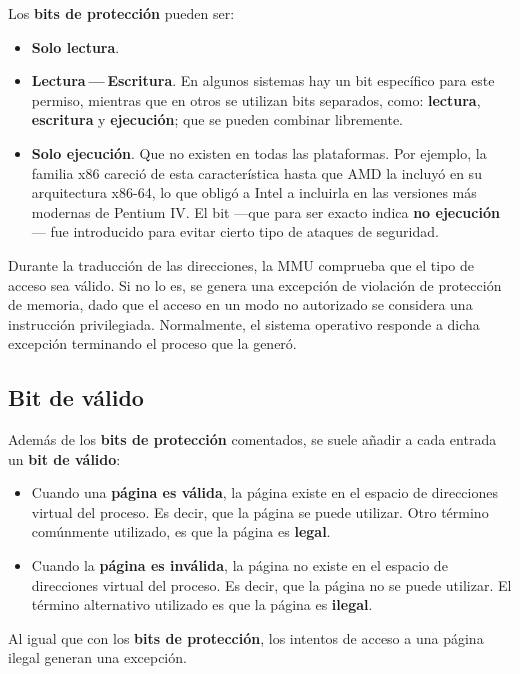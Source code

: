 {} Los \textbf{bits de protección} pueden ser:

\begin{itemize}
\item
  \textbf{Solo lectura}.
\item
  \textbf{Lectura --- Escritura}. En algunos sistemas hay un bit
  específico para este permiso, mientras que en otros se utilizan bits
  separados, como: \textbf{lectura}, \textbf{escritura} y
  \textbf{ejecución}; que se pueden combinar libremente.
\item
  \textbf{Solo ejecución}. Que no existen en todas las plataformas. Por
  ejemplo, la familia x86 careció de esta característica hasta que AMD
  la incluyó en su arquitectura x86-64, lo que obligó a Intel a
  incluirla en las versiones más modernas de Pentium IV. El bit ---que
  para ser exacto indica \textbf{no ejecución}--- fue introducido para
  evitar cierto tipo de ataques de seguridad.
\end{itemize}

Durante la traducción de las direcciones, la MMU comprueba que el tipo
de acceso sea válido. Si no lo es, se genera una excepción de violación
de protección de memoria, dado que el acceso en un modo no autorizado se
considera una instrucción privilegiada. Normalmente, el sistema
operativo responde a dicha excepción terminando el proceso que la
generó.

\subsection{Bit de válido}\label{_bit_de_vuxe1lido}

{} Además de los \textbf{bits de protección} comentados, se suele añadir
a cada entrada un \textbf{bit de válido}:

\begin{itemize}
\item
  Cuando una \textbf{página es válida}, la página existe en el espacio
  de direcciones virtual del proceso. Es decir, que la página se puede
  utilizar. Otro término comúnmente utilizado, es que la página es
  \textbf{legal}{}.
\item
  Cuando la \textbf{página es inválida}, la página no existe en el
  espacio de direcciones virtual del proceso. Es decir, que la página no
  se puede utilizar. El término alternativo utilizado es que la página
  es \textbf{ilegal}{}.
\end{itemize}

Al igual que con los \textbf{bits de protección}, los intentos de acceso
a una página ilegal generan una excepción.

